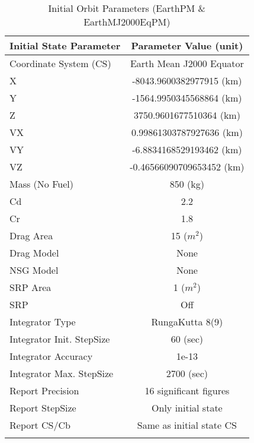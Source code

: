 \begin{table}[htbp!]
\centering \caption{Initial Orbit Parameters (EarthPM \&
EarthMJ2000EqPM)}
      \begin{tabular}{lc}
      \hline\hline
            Initial State Parameter & Parameter Value (unit)\\
            \hline
            Coordinate System (CS) & Earth Mean J2000 Equator\\
            X & -8043.9600382977915 (km)\\
            Y & -1564.9950345568864 (km)\\
            Z & 3750.9601677510364 (km)\\
            VX & 0.99861303787927636 (km)\\
            VY & -6.8834168529193462 (km)\\
            VZ & -0.46566090709653452 (km)\\
            Mass (No Fuel) & 850 (kg)\\
            Cd & 2.2\\
            Cr & 1.8\\
            Drag Area & 15 ($m^2$)\\
            Drag Model & None\\
            NSG Model & None\\
            SRP Area & 1 ($m^2$)\\
            SRP & Off\\
            Integrator Type & RungaKutta 8(9)\\
            Integrator Init. StepSize & 60 (sec)\\
            Integrator Accuracy & 1e-13\\
            Integrator Max. StepSize & 2700 (sec)\\
            Report Precision & 16 significant figures\\
            Report StepSize & Only initial state\\
            Report CS/Cb & Same as initial state CS\\
      \hline\hline
      \label{Table: InitStopCondStatePM}
\end{tabular}
\end{table}

